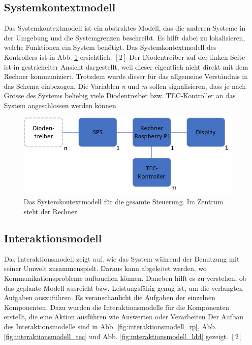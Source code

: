 \subsection{Systemkontextmodell}
Das Systemkontextmodell ist ein abstraktes Modell, das die anderen Systeme in der Umgebung und die Systemgrenzen beschreibt. Es hilft dabei zu lokalisieren, welche Funktionen ein System benötigt. Das Systemkontextmodell des Kontrollers ist in Abb. \ref{fig:systemkontextmodell} ersichtlich. $[2]$ Der Diodentreiber auf der linken Seite ist in gestrichelter Ansicht dargestellt, weil dieser eigentlich nicht direkt mit dem Rechner kommuniziert. Trotzdem wurde dieser für das allgemeine Verständnis in das Schema einbezogen. Die Variablen \textit{n} und \textit{m} sollen signalisieren, dass je nach Grösse des Systems beliebig viele Diodentreiber bzw. TEC-Kontroller an das System angeschlossen werden können.

\begin{figure}[H]
    \centering
    \includegraphics[scale=0.6]{98_images/systemkontext_modell_raspberry_pi.jpg}
    \caption{Das Systemkontextmodell für die gesamte Steuerung. Im Zentrum steht der Rechner.}
    \label{fig:systemkontextmodell}
\end{figure}

\subsection{Interaktionsmodell}
Das Interaktionsmodell zeigt auf, wie das System während der Benutzung mit seiner Umwelt zusammenspielt. Daraus kann abgeleitet werden, wo Kommunikationsprobleme auftauchen können. Daneben hilft es zu verstehen, ob das geplante Modell ausreicht bzw. Leistungsfähig genug ist, um die verlangten Aufgaben auszuführen. Es veranschaulicht die Aufgaben der einzelnen Komponenten. Dazu wurden die Interaktionsmodelle für die Komponenten erstellt, die eine Aktion ausführen wie Auswerten oder Verarbeiten  Der Aufbau des Interaktionsmodelle sind in Abb. \ref{fig:interaktionsmodell_rp}, Abb. \ref{fig:interaktionsmodell_tec} und Abb. \ref{fig:interaktionsmodell_ldd} gezeigt. $[2]$

